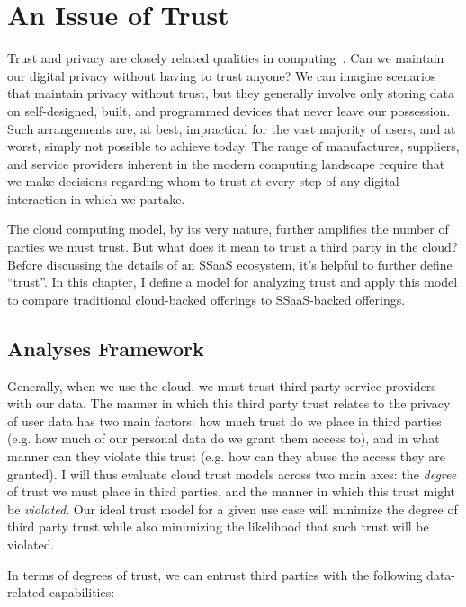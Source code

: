 \chapter{An Issue of Trust}
\label{chap:trust}

Trust and privacy are closely related qualities in
computing~\cite{flowerday2006}. Can we maintain our digital privacy
without having to trust anyone? We can imagine scenarios that maintain
privacy without trust, but they generally involve only storing data on
self-designed, built, and programmed devices that never leave our
possession. Such arrangements are, at best, impractical for the vast
majority of users, and at worst, simply not possible to achieve
today. The range of manufactures, suppliers, and service providers
inherent in the modern computing landscape require that we make
decisions regarding whom to trust at every step of any digital
interaction in which we partake.

The cloud computing model, by its very nature, further amplifies the
number of parties we must trust. But what does it mean to trust a
third party in the cloud? Before discussing the details of an SSaaS
ecosystem, it's helpful to further define ``trust''. In this chapter,
I define a model for analyzing trust and apply this model to compare
traditional cloud-backed offerings to SSaaS-backed offerings.

\section{Analyses Framework}
\label{chap:trust:framework}

Generally, when we use the cloud, we must trust third-party service
providers with our data. The manner in which this third party trust
relates to the privacy of user data has two main factors: how much
trust do we place in third parties (e.g. how much of our personal data
do we grant them access to), and in what manner can they violate this
trust (e.g. how can they abuse the access they are granted). I will thus
evaluate cloud trust models across two main axes: the \emph{degree} of
trust we must place in third parties, and the manner in which this
trust might be \emph{violated}. Our ideal trust model for a given use
case will minimize the degree of third party trust while also
minimizing the likelihood that such trust will be violated.

In terms of degrees of trust, we can entrust third parties with the
following data-related capabilities:

